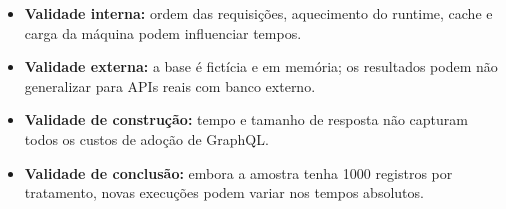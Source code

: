 \documentclass[12pt,a4paper]{article}
\begin{document}
\begin{itemize}
  \item \textbf{Validade interna:} ordem das requisições, aquecimento do runtime, cache e carga da máquina podem influenciar tempos.
  \item \textbf{Validade externa:} a base é fictícia e em memória; os resultados podem não generalizar para APIs reais com banco externo.
  \item \textbf{Validade de construção:} tempo e tamanho de resposta não capturam todos os custos de adoção de GraphQL.
  \item \textbf{Validade de conclusão:} embora a amostra tenha 1000 registros por tratamento, novas execuções podem variar nos tempos absolutos.
\end{itemize}



\end{document}
